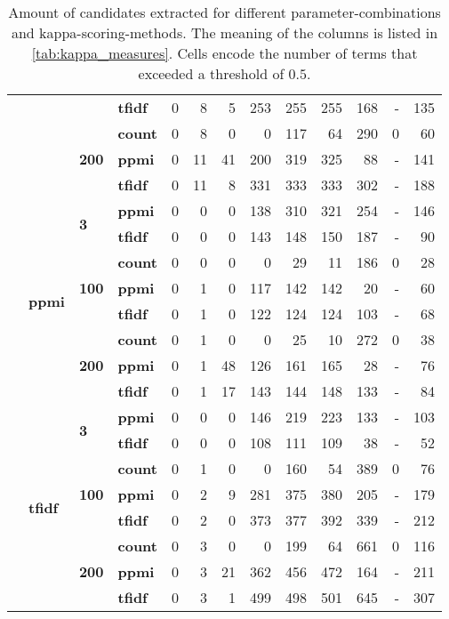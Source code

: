 \begin{table}[H]
{\begin{tabular}{llllrrrrrrrrr}
	 &  &  & \textbf{tfidf} & 0 & 8 & 5 & 253 & 255 & 255 & 168 & - & 135 \\
	\cline{3-4}
	 &  & \multirow[t]{3}{*}{\textbf{200}} & \textbf{count} & 0 & 8 & 0 & 0 & 117 & 64 & 290 & 0 & 60 \\
	 &  &  & \textbf{ppmi} & 0 & {\cellcolor{lightgreen}} 11 & 41 & 200 & 319 & 325 & 88 & - & 141 \\
	 &  &  & \textbf{tfidf} & 0 & {\cellcolor{lightgreen}} 11 & 8 & 331 & 333 & 333 & 302 & - & 188 \\
	\cline{2-4} \cline{3-4}
	 & \multirow[t]{8}{*}{\textbf{ppmi}} & \multirow[t]{2}{*}{\textbf{3}} & \textbf{ppmi} & 0 & 0 & 0 & 138 & 310 & 321 & 254 & - & 146 \\
	 &  &  & \textbf{tfidf} & 0 & 0 & 0 & 143 & 148 & 150 & 187 & - & 90 \\
	\cline{3-4}
	 &  & \multirow[t]{3}{*}{\textbf{100}} & \textbf{count} & 0 & 0 & 0 & 0 & 29 & 11 & 186 & 0 & 28 \\
	 &  &  & \textbf{ppmi} & 0 & 1 & 0 & 117 & 142 & 142 & 20 & - & 60 \\
	 &  &  & \textbf{tfidf} & 0 & 1 & 0 & 122 & 124 & 124 & 103 & - & 68 \\
	\cline{3-4}
	 &  & \multirow[t]{3}{*}{\textbf{200}} & \textbf{count} & 0 & 1 & 0 & 0 & 25 & 10 & 272 & 0 & 38 \\
	 &  &  & \textbf{ppmi} & 0 & 1 & 48 & 126 & 161 & 165 & 28 & - & 76 \\
	 &  &  & \textbf{tfidf} & 0 & 1 & 17 & 143 & 144 & 148 & 133 & - & 84 \\
	\cline{2-4} \cline{3-4}
	 & \multirow[t]{8}{*}{\textbf{tfidf}} & \multirow[t]{2}{*}{\textbf{3}} & \textbf{ppmi} & 0 & 0 & 0 & 146 & 219 & 223 & 133 & - & 103 \\
	 &  &  & \textbf{tfidf} & 0 & 0 & 0 & 108 & 111 & 109 & 38 & - & 52 \\
	\cline{3-4}
	 &  & \multirow[t]{3}{*}{\textbf{100}} & \textbf{count} & 0 & 1 & 0 & 0 & 160 & 54 & 389 & 0 & 76 \\
	 &  &  & \textbf{ppmi} & 0 & 2 & 9 & 281 & 375 & 380 & 205 & - & 179 \\
	 &  &  & \textbf{tfidf} & 0 & 2 & 0 & 373 & 377 & 392 & 339 & - & 212 \\
	\cline{3-4}
	 &  & \multirow[t]{3}{*}{\textbf{200}} & \textbf{count} & 0 & 3 & 0 & 0 & 199 & 64 & 661 & 0 & 116 \\
	 &  &  & \textbf{ppmi} & 0 & 3 & 21 & 362 & 456 & 472 & 164 & - & 211 \\
	 &  &  & \textbf{tfidf} & 0 & 3 & 1 & 499 & 498 & 501 & 645 & - & 307 \\
	\bottomrule
	\end{tabular}
	}
	\caption[Amount of candidates extracted for different parameter-combinations.]{Amount of candidates extracted for different parameter-combinations and kappa-scoring-methods. The meaning of the columns is listed in \autoref{tab:kappa_measures}. Cells encode the number of terms that exceeded a threshold of $0.5$.
	\label{tab:kappa_table}}
	\label{tab:cands_per_config}
\end{table}
